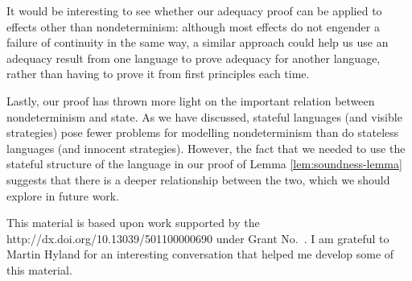 \documentclass[sigplan,9pt,review]{acmart}\settopmatter{printfolios=true,printccs=false,printacmref=false}
\begin{document}
It would be interesting to see whether our adequacy proof can be applied to effects other than nondeterminism: although most effects do not engender a failure of continuity in the same way, a similar approach could help us use an adequacy result from one language to prove adequacy for another language, rather than having to prove it from first principles each time.

Lastly, our proof has thrown more light on the important relation between nondeterminism and state.  
As we have discussed, stateful languages (and visible strategies) pose fewer problems for modelling nondeterminism than do stateless languages (and innocent strategies).  
However, the fact that we needed to use the stateful structure of the language in our proof of Lemma \ref{lem:soundness-lemma} suggests that there is a deeper relationship between the two, which we should explore in future work.

\begin{acks}                            %
  This material is based upon work supported by the
  {http://dx.doi.org/10.13039/501100000690} under Grant
  No.~.   I am grateful to Martin Hyland for an interesting conversation that helped me develop some of this material.
\end{acks}



\end{document}
